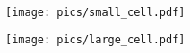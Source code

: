 \documentclass{article}
\begin{document}
\begin{figure}[btp]
\begin{center}
\begin{minipage}{0.33\textwidth}
\texttt{[image: pics/small\_cell.pdf]}
\subcaption{}
\end{minipage}
\begin{minipage}{0.33\textwidth}
\texttt{[image: pics/large\_cell.pdf]}
\subcaption{}
\end{minipage}
\end{center}
\end{figure}
\end{document}
